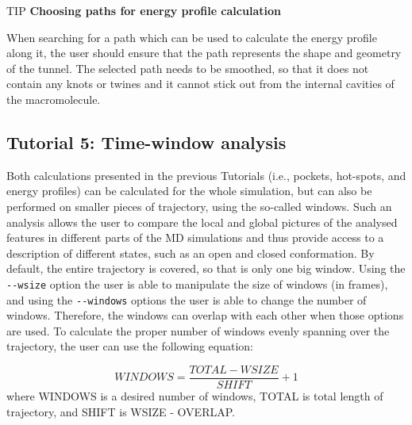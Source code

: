 \documentclass[9pt,tutorial]{livecoms}
\begin{document}
\begin{Checklists}
\begin{checklist}{TIP}
\textbf{Choosing paths for energy profile calculation}

When searching for a path which can be used to calculate the energy profile along it, the user should ensure that the path represents the shape and geometry of the tunnel. The selected path needs to be smoothed, so that it does not contain any knots or twines and it cannot stick out from the internal cavities of the macromolecule.
\end{checklist}
\end{Checklists}

\subsection{Tutorial 5: Time-window analysis}

Both calculations presented in the previous Tutorials (i.e., pockets, hot-spots, and energy profiles) can be calculated for the whole simulation, but can also be performed on smaller pieces of trajectory, using the so-called windows. Such an analysis allows the user to compare the local and global pictures of the analysed features in different parts of the MD simulations and thus provide access to a description of different states, such as an open and closed conformation. By default, the entire trajectory is covered, so that is only one big window. Using the \texttt{-{}-wsize} option the user is able to manipulate the size of windows (in frames), and using the \texttt{-{}-windows} options the user is able to change the number of windows. Therefore, the windows can overlap with each other when those options are used.
To calculate the proper number of windows evenly spanning over the trajectory, the user can use the following equation:
 
\[ \displaystyle WINDOWS = \frac{TOTAL - WSIZE}{SHIFT} + 1 \]
where WINDOWS is a desired number of windows, TOTAL is total length of trajectory, and SHIFT is WSIZE - OVERLAP.
\end{document}
